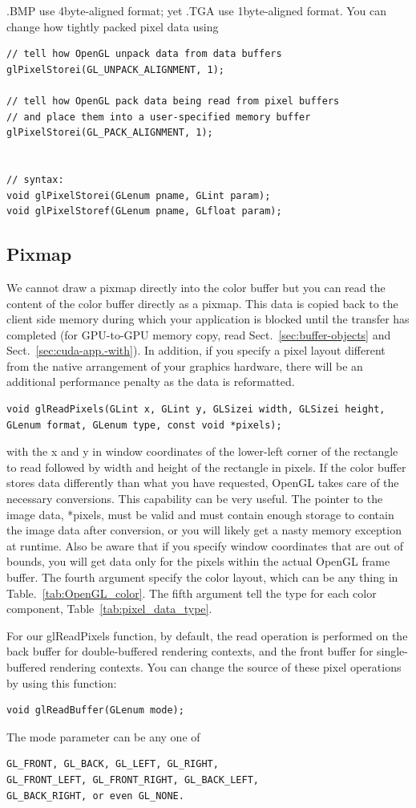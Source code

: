 .BMP use 4byte-aligned format; yet .TGA use 1byte-aligned format. You
can change how tightly packed pixel data using
\begin{verbatim}
// tell how OpenGL unpack data from data buffers
glPixelStorei(GL_UNPACK_ALIGNMENT, 1);

// tell how OpenGL pack data being read from pixel buffers
// and place them into a user-specified memory buffer
glPixelStorei(GL_PACK_ALIGNMENT, 1);


// syntax:
void glPixelStorei(GLenum pname, GLint param);
void glPixelStoref(GLenum pname, GLfloat param);
\end{verbatim}

\subsection{Pixmap}
\label{sec:pixmap}

We cannot draw a pixmap directly into the color buffer but you can
read the content of the color buffer directly as a pixmap. This data
is copied back to the client side memory during which your application
is blocked until the transfer has completed (for GPU-to-GPU memory
copy, read Sect.~\ref{sec:buffer-objects} and
Sect.~\ref{sec:cuda-app.-with}). In addition, if you specify a pixel
layout different from the native arrangement of your graphics
hardware, there will be an additional performance penalty as the data
is reformatted.
\begin{verbatim}
void glReadPixels(GLint x, GLint y, GLSizei width, GLSizei height,
GLenum format, GLenum type, const void *pixels);
\end{verbatim}
with the x and y in window coordinates of the lower-left corner of the
rectangle to read followed by width and height of the rectangle in
pixels. If the color buffer stores data differently than what you have
requested, OpenGL takes care of the necessary conversions.  This
capability can be very useful. The pointer to the image data, *pixels,
must be valid and must contain enough storage to contain the image
data after conversion, or you will likely get a nasty memory exception
at runtime. Also be aware that if you specify window coordinates that
are out of bounds, you will get data only for the pixels within the
actual OpenGL frame buffer. The fourth argument specify the color
layout, which can be any thing in Table.~\ref{tab:OpenGL_color}. The
fifth argument tell the type for each color component,
Table~\ref{tab:pixel_data_type}. 


For our glReadPixels function, by default, the read operation is
performed on the back buffer for double-buffered rendering contexts,
and the front buffer for single-buffered rendering contexts. You can
change the source of these pixel operations by using this function:
\begin{verbatim}
void glReadBuffer(GLenum mode);
\end{verbatim}
The mode parameter can be any one of 
\begin{verbatim}
GL_FRONT, GL_BACK, GL_LEFT, GL_RIGHT,
GL_FRONT_LEFT, GL_FRONT_RIGHT, GL_BACK_LEFT, 
GL_BACK_RIGHT, or even GL_NONE.
\end{verbatim}


